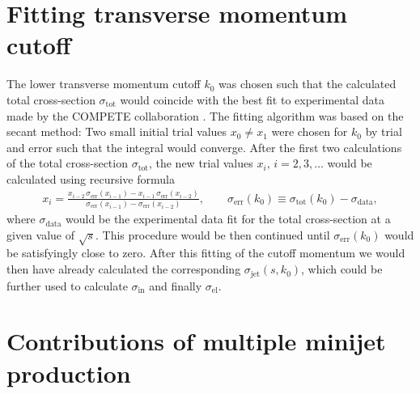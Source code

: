 \documentclass[a4paper, twoside, english, 12pt]{report}
\begin{document}
\section{Fitting transverse momentum cutoff}\label{SS:fitting}

The lower transverse momentum cutoff $k_0$ was chosen such that the calculated total cross-section $\sigma_{\text{tot}}$ would coincide with the best fit to experimental data made by the COMPETE collaboration \cite{compete}. The fitting algorithm was based on the secant method: Two small initial trial values $x_0\neq x_1$ were chosen for $k_0$ by trial and error such that the integral would converge.  After the first two calculations of the total cross-section $\sigma_{\text{tot}}$, the new trial values $x_i$, $i=2,3,\ldots$ would be calculated using recursive formula
\begin{align}
	x_i = \frac{x_{i-2}\,\sigma_{\text{err}}(x_{i-1})-x_{i-1}\,\sigma_{\text{err}}(x_{i-2})}{\sigma_{\text{err}}(x_{i-1})-\sigma_{\text{err}}(x_{i-2})}, \qquad \sigma_{\text{err}}(k_0)\equiv \sigma_{\text{tot}}(k_0)-\sigma_{\text{data}},
\end{align}
where $\sigma_{\text{data}}$ would be the experimental data fit for the total cross-section at a given value of $\sqrt{s}$. This procedure would be then continued until $\sigma_{\text{err}}(k_0)$ would be satisfyingly close to zero. After this fitting of the cutoff momentum we would then have already calculated the corresponding $\sigma_{\text{jet}}(s, k_0)$, which could be further used to calculate $\sigma_{\text{in}}$ and finally $\sigma_{\text{el}}$.



\section{Contributions of multiple minijet production}\label{SS:multiple_jets}
\end{document}
